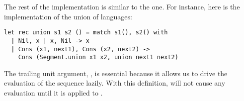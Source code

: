 The rest of the implementation is similar to the \haskell one. For instance,
here is the implementation of the union of languages:
\begin{lstlisting}
let rec union s1 s2 () = match s1(), s2() with
  | Nil, x | x, Nil -> x
  | Cons (x1, next1), Cons (x2, next2) -> 
    Cons (Segment.union x1 x2, union next1 next2)
\end{lstlisting}
The trailing unit argument, \code{()}, is essential because it allows
us to drive the evaluation of the sequence lazily. With this definition, 
will not cause  any evaluation until it is applied to \code{()}.





